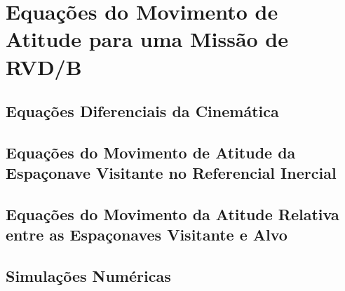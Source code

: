 

\section{Equações do Movimento de Atitude para uma Missão de RVD/B}

\subsection{Equações Diferenciais da Cinemática}
\subsection{Equações do Movimento de Atitude da Espaçonave Visitante no Referencial Inercial}
\subsection{Equações do Movimento da Atitude Relativa entre as Espaçonaves Visitante e Alvo}
\subsection{Simulações Numéricas}

